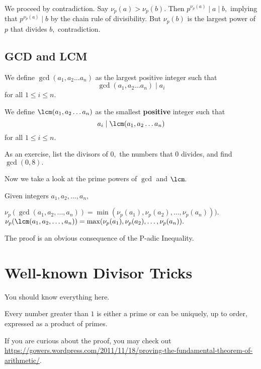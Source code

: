 \documentclass{article}
\begin{document}
\begin{pro}
We proceed by contradiction. Say $\nu_p(a)>\nu_p(b).$ Then $p^{\nu_p(a)}\mid a\mid b,$ implying that $p^{\nu_p(a)}\mid b$ by the chain rule of divisibility. But $\nu_p(b)$ is the largest power of $p$ that divides $b,$ contradiction.
\end{pro}

\subsection{GCD and LCM}
\begin{defi}We define $\gcd(a_1,a_2\dots a_n)$ as the largest positive integer such that \[\gcd(a_1,a_2\dots a_n)\mid a_i\] for all $1\leq i\leq n.$\end{defi}

\begin{defi}We define $\lcm(a_1,a_2\dots a_n)$ as the smallest \textbf{positive} integer such that \[a_i\mid \lcm(a_1,a_2\dots a_n)\] for all $1\leq i\leq n.$\end{defi}
As an exercise, list the divisors of $0,$ the numbers that $0$ divides, and find $\gcd(0,8).$

Now we take a look at the prime powers of $\gcd$ and $\lcm.$
\begin{fact}
Given integers $a_1,a_2,\ldots,a_n,$
\begin{itemize}
\Item $\nu_p(\gcd(a_1,a_2,\ldots,a_n))=\min(\nu_p(a_1),\nu_p(a_2),\ldots,\nu_p(a_n))).$
\Item $\nu_p(\lcm(a_1,a_2,\ldots,a_n))=\max(\nu_p(a_1),\nu_p(a_2),\ldots,\nu_p(a_n)).$
\end{itemize}
\end{fact}

The proof is an obvious consequence of the P-adic Inequality.

\section{Well-known Divisor Tricks}
You should know everything here.

\begin{theo}
Every number greater than $1$ is either a prime or can be uniquely, up to order, expressed as a product of primes.
\end{theo}

If you are curious about the proof, you may check out \url{https://gowers.wordpress.com/2011/11/18/proving-the-fundamental-theorem-of-arithmetic/}.
\end{document}
